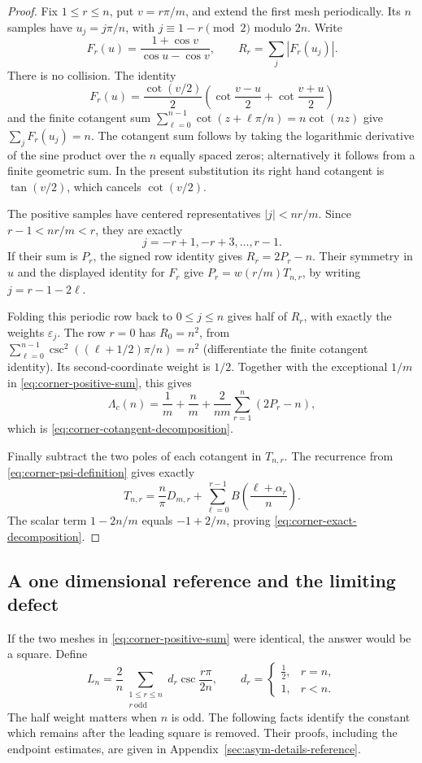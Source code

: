 \begin{proof}
Fix $1\leq r\leq n$, put $v=r\pi/m$, and extend the first mesh
periodically.  Its $n$ samples have $u_j=j\pi/n$, with
$j\equiv1-r\pmod2$ modulo $2n$.  Write
\[
 F_r(u)=\frac{1+\cos v}{\cos u-\cos v},\qquad
 R_r=\sum_j|F_r(u_j)|.
\]
There is no collision.  The identity
\[
 F_r(u)=\frac{\cot(v/2)}2
       \left(\cot\frac{v-u}{2}+\cot\frac{v+u}{2}\right)
\]
and the finite cotangent sum
$\sum_{\ell=0}^{n-1}\cot(z+\ell\pi/n)=n\cot(nz)$ give
$\sum_jF_r(u_j)=n$.  The cotangent sum follows by taking the
logarithmic derivative of the sine product over the $n$ equally
spaced zeros; alternatively it follows from a finite geometric sum.
In the present substitution its right hand cotangent is $\tan(v/2)$,
which cancels $\cot(v/2)$.

The positive samples have centered representatives $|j|<nr/m$.
Since $r-1<nr/m<r$, they are exactly
\[
 j=-r+1,-r+3,\ldots,r-1.
\]
If their sum is $P_r$, the signed row identity gives $R_r=2P_r-n$.
Their symmetry in $u$ and the displayed identity for $F_r$ give
$P_r=w(r/m)T_{n,r}$, by writing $j=r-1-2\ell$.

Folding this periodic row back to $0\leq j\leq n$ gives half of
$R_r$, with exactly the weights $\varepsilon_j$.  The row $r=0$
has $R_0=n^2$, from
$\sum_{\ell=0}^{n-1}\csc^2((\ell+1/2)\pi/n)=n^2$ (differentiate
the finite cotangent identity).  Its second-coordinate weight is
$1/2$.  Together with the exceptional $1/m$ in
\eqref{eq:corner-positive-sum}, this gives
\[
 \Lambda_c(n)=\frac1m+\frac nm+\frac2{nm}\sum_{r=1}^n(2P_r-n),
\]
which is \eqref{eq:corner-cotangent-decomposition}.

Finally subtract the two poles of each cotangent in $T_{n,r}$.
The recurrence from \eqref{eq:corner-psi-definition} gives exactly
\[
 T_{n,r}=\frac n\pi D_{m,r}
       +\sum_{\ell=0}^{r-1}B\!\left(\frac{\ell+\alpha_r}{n}\right).
\]
The scalar term $1-2n/m$ equals $-1+2/m$, proving
\eqref{eq:corner-exact-decomposition}.
\end{proof}

\subsection{A one dimensional reference and the limiting defect}

If the two meshes in \eqref{eq:corner-positive-sum} were identical,
the answer would be a square.  Define
\begin{equation}\label{eq:corner-L-definition}
 L_n=\frac2n\sum_{\substack{1\leq r\leq n\\r\ \mathrm{odd}}}
       d_r\csc\frac{r\pi}{2n},\qquad
 d_r=\begin{cases}\tfrac12,&r=n,\\1,&r<n.\end{cases}
\end{equation}
The half weight matters when $n$ is odd.  The following facts identify
the constant which remains after the leading square is removed.  Their
proofs, including the endpoint estimates, are given in
Appendix~\ref{sec:asym-details-reference}.

